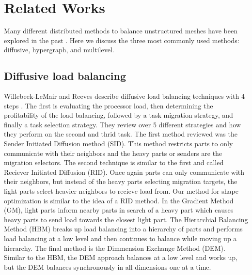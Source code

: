 \documentclass{thesis}
\begin{document}
\chapter{Related Works}

Many different distributed methods to balance unstructured meshes have been explored in the 
past \cite{multidiffuse,surveygraph}. Here we discuss the three most commonly 
used methods: diffusive, hypergraph, and multilevel.

\section{Diffusive load balancing}
Willebeek-LeMair and Reeves describe diffusive load balancing techniques with 
4 steps \cite{loadbalance}. The first is evaluating the processor load, then 
determining the profitability of the load balancing, followed by a task 
migration strategy, and finally a task selection strategy. They review over 5 
different strategies and how they perform on the second and thrid task. The first 
method reviewed was the Sender Initiated Diffusion method (SID). This method 
restricts parts to only communicate with their neighbors and the heavy parts or 
senders are the migration selectors. The second technique is similar to the first 
and called Reciever Initiated Diffusion (RID). Once again parts can only 
communicate with their neighbors, but instead of the heavy parts selecting 
migration targets, the light parts select heavier neighbors to recieve load from. 
Our method for shape optimization is similar to the idea of a RID method. In the 
Gradient Method (GM), light parts inform nearby parts in search of a heavy part 
which causes heavy parts to send load towards the closest light part. The 
Hierarchial Balancing Method (HBM) breaks up load balancing into a hierarchy of 
parts and performs load balancing at a low level and then continues to balance 
while moving up a hierarchy. The final method is the Dimmension Exchange Method
 (DEM). Similar to the HBM, the DEM approach balances at a low level and works 
up, but the DEM balances synchronously in all dimensions one at a time.
\end{document}
